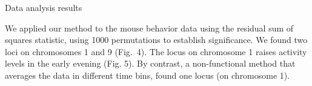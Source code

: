 \documentclass[final,plain]{beamer}
\newlength{\onecolwid}
\begin{document}
\begin{frame}[t]
\begin{columns}[t]
    
    

  \begin{column}{\onecolwid}
    
    \begin{block}{Data analysis results}

      We applied our method to the mouse behavior data using the
      residual sum of squares statistic, using 1000 permutations to
      establish significance.  We found two loci on
      chromosomes 1 and 9 (Fig.~4).  The locus on chromosome 1 raises
      activity levels in the early evening (Fig. 5).  By contrast, a
      non-functional method that averages the data in different time
      bins, found one locus (on chromosome 1). %


\end{block}
\end{column}
\end{columns}
\end{frame}
\end{document}
